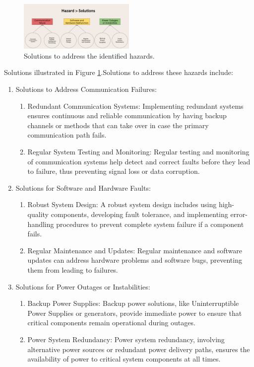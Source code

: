 \begin{figure}[ht]
    \centering
    \includegraphics[width=0.5\textwidth]{images/hazard_solutions.png}
    \caption{Solutions to address the identified hazards.}
    \label{fig:hazard_solutions}
\end{figure}

Solutions illustrated in Figure \ref{fig:hazard_solutions}.Solutions to address these hazards include:

\begin{enumerate}
    \item Solutions to Address Communication Failures:
    \begin{enumerate}
        \item Redundant Communication Systems: Implementing redundant systems ensures continuous and reliable communication by having backup channels or methods that can take over in case the primary communication path fails.
        \item Regular System Testing and Monitoring: Regular testing and monitoring of communication systems help detect and correct faults before they lead to failure, thus preventing signal loss or data corruption.
    \end{enumerate}

    \item Solutions for Software and Hardware Faults:
    \begin{enumerate}
        \item Robust System Design: A robust system design includes using high-quality components, developing fault tolerance, and implementing error-handling procedures to prevent complete system failure if a component fails.
        \item Regular Maintenance and Updates: Regular maintenance and software updates can address hardware problems and software bugs, preventing them from leading to failures.
    \end{enumerate}

    \item Solutions for Power Outages or Instabilities:
    \begin{enumerate}
        \item Backup Power Supplies: Backup power solutions, like Uninterruptible Power Supplies or generators, provide immediate power to ensure that critical components remain operational during outages.
        \item Power System Redundancy: Power system redundancy, involving alternative power sources or redundant power delivery paths, ensures the availability of power to critical system components at all times.
    \end{enumerate}
\end{enumerate}
